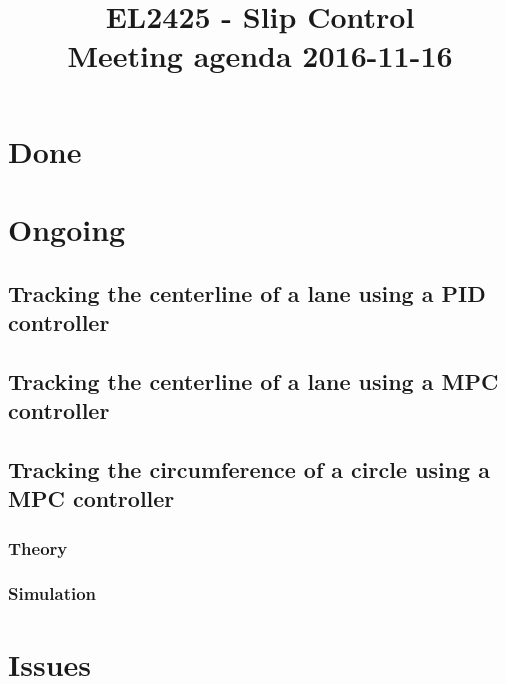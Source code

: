 \documentclass[oneside,12pt]{article}
\title{EL2425 - Slip Control \\ Meeting agenda 2016-11-16}
\begin{document}
\maketitle

\section{Done}




\section{Ongoing}

  \subsection{Tracking the centerline of a lane using a PID controller}

    

  \subsection{Tracking the centerline of a lane using a MPC controller}

    


  \subsection{Tracking the circumference of a circle using a MPC controller}

    \subsubsection{Theory}
      
    \subsubsection{Simulation}
      

\section{Issues}

\end{document}
